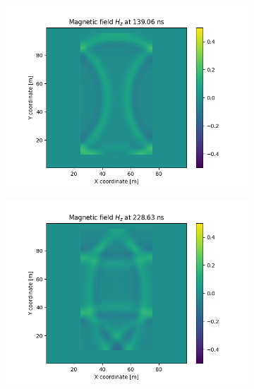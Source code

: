 \documentclass[12pt, oneside]{book}
\begin{document}
\begin{figure}[H]
    
    \begin{subfigure}[b]{0.49\textwidth}
        \centering
        \includegraphics[width=\textwidth]{Imagenes/CFDTD2D_GaussianStability3.png}
    \end{subfigure}
    \begin{subfigure}[b]{0.49\textwidth}
        \centering
        \includegraphics[width=\textwidth]{Imagenes/CFDTD2D_GaussianStability4.png}
    \end{subfigure}


\end{figure}
\end{document}
